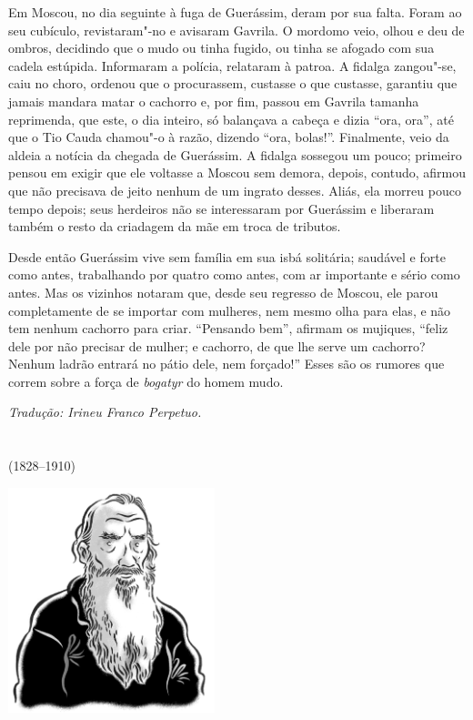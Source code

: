 Em Moscou, no dia seguinte à fuga de Guerássim, deram por sua falta.
Foram ao seu cubículo, revistaram"-no e avisaram Gavrila. O mordomo veio,
olhou e deu de ombros, decidindo que o mudo ou tinha fugido, ou tinha se
afogado com sua cadela estúpida. Informaram a polícia, relataram à
patroa. A fidalga zangou"-se, caiu no choro, ordenou que o procurassem,
custasse o que custasse, garantiu que jamais mandara matar o cachorro e,
por fim, passou em Gavrila tamanha reprimenda, que este, o dia inteiro,
só balançava a cabeça e dizia ``ora, ora'', até que o Tio Cauda chamou"-o
à razão, dizendo ``ora, bolas!''. Finalmente, veio da aldeia a notícia
da chegada de Guerássim. A fidalga sossegou um pouco; primeiro pensou em
exigir que ele voltasse a Moscou sem demora, depois, contudo, afirmou
que não precisava de jeito nenhum de um ingrato desses. Aliás, ela
morreu pouco tempo depois; seus herdeiros não se interessaram por
Guerássim e liberaram também o resto da criadagem da mãe em troca de
tributos.

Desde então Guerássim vive sem família em sua isbá solitária; saudável e
forte como antes, trabalhando por quatro como antes, com ar importante e
sério como antes. Mas os vizinhos notaram que, desde seu regresso de
Moscou, ele parou completamente de se importar com mulheres, nem mesmo
olha para elas, e não tem nenhum cachorro para criar. ``Pensando bem'',
afirmam os mujiques, ``feliz dele por não precisar de mulher; e
cachorro, de que lhe serve um cachorro? Nenhum ladrão entrará no pátio
dele, nem forçado!'' Esses são os rumores que correm sobre a força de
\emph{bogatyr} do homem mudo.

\medskip

{\footnotesize\hfill\emph{Tradução: Irineu Franco Perpetuo.}}


\chapter*{}
\label{part4}
\thispagestyle{empty}

\begin{vplace}[1.5]
{\HUGES\hfill{}}

{\LARGE\hfill\textlt(1828–1910)}
\end{vplace}


\pagebreak
\thispagestyle{empty}
\mbox{}
\vfill
\begin{center}
\includegraphics[width=6cm]{./imgs/autor4.jpg}
\end{center}



